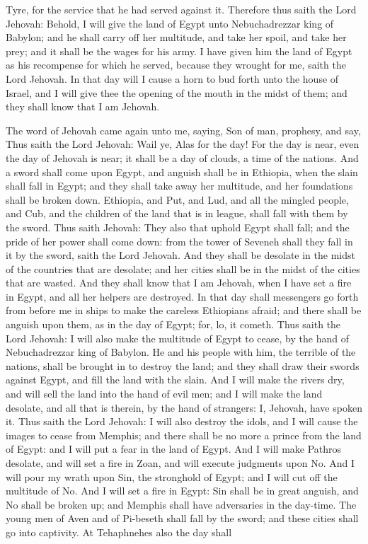Tyre, for the service that he had served against it. Therefore thus saith the Lord Jehovah: Behold, I will give the land of Egypt unto Nebuchadrezzar king of Babylon; and he shall carry off her multitude, and take her spoil, and take her prey; and it shall be the wages for his army. I have given him the land of Egypt as his recompense for which he served, because they wrought for me, saith the Lord Jehovah.  In that day will I cause a horn to bud forth unto the house of Israel, and I will give thee the opening of the mouth in the midst of them; and they shall know that I am Jehovah. 

The word of Jehovah came again unto me, saying, Son of man, prophesy, and say, Thus saith the Lord Jehovah: Wail ye, Alas for the day! For the day is near, even the day of Jehovah is near; it shall be a day of clouds, a time of the nations. And a sword shall come upon Egypt, and anguish shall be in Ethiopia, when the slain shall fall in Egypt; and they shall take away her multitude, and her foundations shall be broken down. Ethiopia, and Put, and Lud, and all the mingled people, and Cub, and the children of the land that is in league, shall fall with them by the sword.  Thus saith Jehovah: They also that uphold Egypt shall fall; and the pride of her power shall come down: from the tower of Seveneh shall they fall in it by the sword, saith the Lord Jehovah. And they shall be desolate in the midst of the countries that are desolate; and her cities shall be in the midst of the cities that are wasted. And they shall know that I am Jehovah, when I have set a fire in Egypt, and all her helpers are destroyed. In that day shall messengers go forth from before me in ships to make the careless Ethiopians afraid; and there shall be anguish upon them, as in the day of Egypt; for, lo, it cometh.  Thus saith the Lord Jehovah: I will also make the multitude of Egypt to cease, by the hand of Nebuchadrezzar king of Babylon. He and his people with him, the terrible of the nations, shall be brought in to destroy the land; and they shall draw their swords against Egypt, and fill the land with the slain. And I will make the rivers dry, and will sell the land into the hand of evil men; and I will make the land desolate, and all that is therein, by the hand of strangers: I, Jehovah, have spoken it.  Thus saith the Lord Jehovah: I will also destroy the idols, and I will cause the images to cease from Memphis; and there shall be no more a prince from the land of Egypt: and I will put a fear in the land of Egypt. And I will make Pathros desolate, and will set a fire in Zoan, and will execute judgments upon No. And I will pour my wrath upon Sin, the stronghold of Egypt; and I will cut off the multitude of No. And I will set a fire in Egypt: Sin shall be in great anguish, and No shall be broken up; and Memphis shall have adversaries in the day-time. The young men of Aven and of Pi-beseth shall fall by the sword; and these cities shall go into captivity. At Tehaphnehes also the day shall 